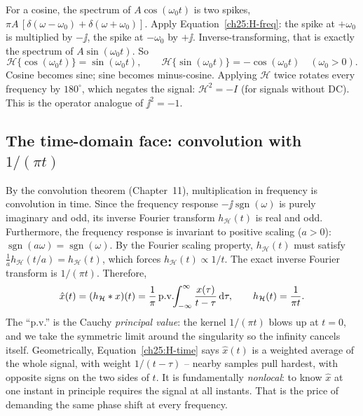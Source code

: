 For a cosine, the spectrum of $A\cos(\omega_0 t)$ is two spikes,
$\pi A\,[\delta(\omega-\omega_0) + \delta(\omega+\omega_0)]$. Apply
Equation~\eqref{ch25:H-freq}: the spike at $+\omega_0$ is multiplied by $-\jj$, the spike
at $-\omega_0$ by $+\jj$. Inverse-transforming, that is exactly the spectrum of
$A\sin(\omega_0 t)$. So
\begin{equation}
\label{ch25:cos-to-sin}
\mathcal{H}\{\cos(\omega_0 t)\} = \sin(\omega_0 t),
\qquad
\mathcal{H}\{\sin(\omega_0 t)\} = -\cos(\omega_0 t)
\quad (\omega_0>0).
\end{equation}
Cosine becomes sine; sine becomes minus-cosine. Applying $\mathcal{H}$ twice rotates every frequency by $180^\circ$, which negates the signal: $\mathcal{H}^2 = -I$ (for signals without DC). This is the operator analogue of $\jj^2=-1$.

\subsection{The time-domain face: convolution with $1/(\pi t)$}
\label{ch25:time-domain}

By the convolution theorem (Chapter~11), multiplication in frequency is convolution in time. Since the frequency response $-\jj\operatorname{sgn}(\omega)$ is purely imaginary and odd, its inverse Fourier transform $h_{\mathcal H}(t)$ is real and odd. Furthermore, the frequency response is invariant to positive scaling ($a>0$): $\operatorname{sgn}(a\omega) = \operatorname{sgn}(\omega)$. By the Fourier scaling property, $h_{\mathcal H}(t)$ must satisfy $\frac{1}{a}h_{\mathcal H}(t/a) = h_{\mathcal H}(t)$, which forces $h_{\mathcal H}(t) \propto 1/t$. The exact inverse Fourier transform is $1/(\pi t)$. Therefore,
\begin{equation}
\label{ch25:H-time}
\hat{x}(t) = (h_{\mathcal H} \ast x)(t)
           = \frac{1}{\pi}\,\text{p.v.}\!\!\int_{-\infty}^{\infty}
             \frac{x(\tau)}{t-\tau}\,\mathrm{d}\tau,
\qquad h_{\mathcal H}(t) = \frac{1}{\pi t}.
\end{equation}
The ``p.v.'' is the Cauchy \emph{principal value}: the kernel $1/(\pi t)$ blows up at
$t=0$, and we take the symmetric limit around the singularity so the infinity cancels
itself. Geometrically, Equation~\eqref{ch25:H-time} says $\hat x(t)$ is a weighted average
of the whole signal, with weight $1/(t-\tau)$ -- nearby samples pull hardest, with
opposite signs on the two sides of $t$. It is fundamentally \emph{nonlocal}: to know
$\hat x$ at one instant in principle requires the signal at all instants. That is the
price of demanding the same phase shift at every frequency.

